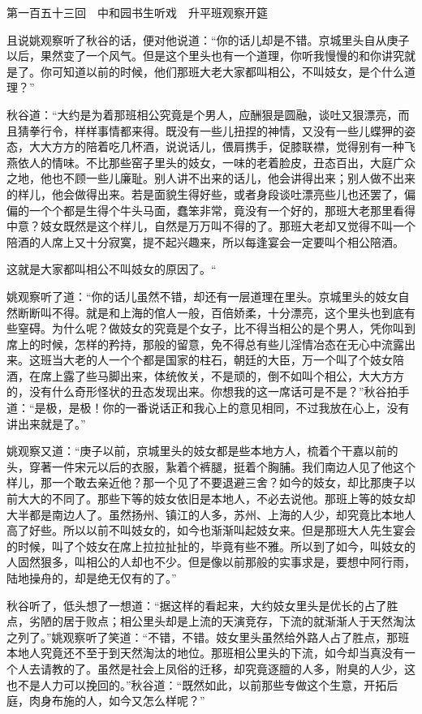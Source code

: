 \documentclass[12pt,UTF8]{ctexbook}
\begin{document}
{{{第一百五十三回　中和园书生听戏　升平班观察开筵





且说姚观察听了秋谷的话，便对他说道：“你的话儿却是不错。京城里头自从庚子以后，果然变了一个风气。但是这个里头也有一个道理，你听我慢慢的和你讲究就是了。你可知道以前的时候，他们那班大老大家都叫相公，不叫妓女，是个什么道理？”

秋谷道：“大约是为着那班相公究竟是个男人，应酬狠是圆融，谈吐又狠漂亮，而且猜拳行令，样样事情都来得。既没有一些儿扭捏的神情，又没有一些儿蝶狎的姿态，大大方方的陪着吃几杯酒，说说话儿，偎肩携手，促膝联襟，觉得别有一种飞燕依人的情味。不比那些窑子里头的妓女，一味的老着脸皮，丑态百出，大庭广众之地，他也不顾一些儿廉耻。别人讲不出来的话儿，他会讲得出来；别人做不出来的样儿，他会做得出来。若是面貌生得好些，或者身段谈吐漂亮些儿也还罢了，偏偏的一个个都是生得个牛头马面，蠢笨非常，竟没有一个好的，那班大老那里看得中意？妓女既然是这个样儿，自然是万万叫不得的了。那班大老却又觉得不叫一个陪酒的人席上又十分寂寞，提不起兴趣来，所以每逢宴会一定要叫个相公陪酒。

这就是大家都叫相公不叫妓女的原因了。“

姚观察听了道：“你的话儿虽然不错，却还有一层道理在里头。京城里头的妓女自然断断叫不得。就是和上海的倌人一般，百倍娇柔，十分漂亮，这个里头也到底有些窒碍。为什么呢？做妓女的究竟是个女子，比不得当相公的是个男人，凭你叫到席上的时候，怎样的矜持，那般的留意，免不得总有些儿淫情冶态在无心中流露出来。这班当大老的人一个个都是国家的柱石，朝廷的大臣，万一个叫了个妓女陪酒，在席上露了些马脚出来，体统攸关，不是顽的，倒不如叫个相公，大大方方的，没有什么奇形怪状的丑态发现出来。你想我的这一席话可是不是？”秋谷拍手道：“是极，是极！你的一番说话正和我心上的意见相同，不过我放在心上，没有讲出来就是了。”

姚观察又道：“庚子以前，京城里头的妓女都是些本地方人，梳着个干嘉以前的头，穿著一件宋元以后的衣服，紥着个裤腿，挺着个胸脯。我们南边人见了他这个样儿，那一个敢去亲近他？那一个见了不要退避三舍？如今的妓女，却比那庚子以前大大的不同了。那些下等的妓女依旧是本地人，不必去说他。那班上等的妓女却大半都是南边人了。虽然扬州、镇江的人多，苏州、上海的人少，却究竟比本地人高了好些。所以以前不叫妓女的，如今也渐渐叫起妓女来。但是那班大人先生宴会的时候，叫了个妓女在席上拉拉扯扯的，毕竟有些不雅。所以到了如今，叫妓女的人固然狠多，叫相公的人却也不少。但是像以前那般的实事求是，要想中阿行雨，陆地操舟的，却是绝无仅有的了。”

秋谷听了，低头想了一想道：“据这样的看起来，大约妓女里头是优长的占了胜点，劣陋的居于败点；相公里头却是上流的天演竞存，下流的就渐渐人于天然淘汰之列了。”姚观察听了笑道：“不错，不错。妓女里头虽然给外路人占了胜点，那班本地人究竟还不至于到天然淘汰的地位。那班相公里头的下流，如今却当真没有一个人去请教的了。虽然是社会上凤俗的迁移，却究竟逐膻的人多，附臭的人少，这也不是人力可以挽回的。”秋谷道：“既然如此，以前那些专做这个生意，开拓后庭，肉身布施的人，如今又怎么样呢？”

}}}
\end{document}
